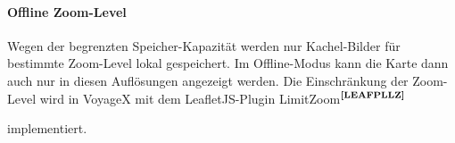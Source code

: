 \paragraph{Offline Zoom-Level}
Wegen der begrenzten Speicher-Kapazität werden nur Kachel-Bilder für bestimmte Zoom-Level lokal gespeichert.
Im Offline-Modus kann die Karte dann auch nur in diesen Auflösungen angezeigt werden. Die Einschränkung der Zoom-Level wird  in VoyageX mit dem LeafletJS-Plugin LimitZoom$^{\textbf{\ref{LEAFPLLZ}}}$
\addtocounter{footnote}{1}%
 implementiert.  
%
